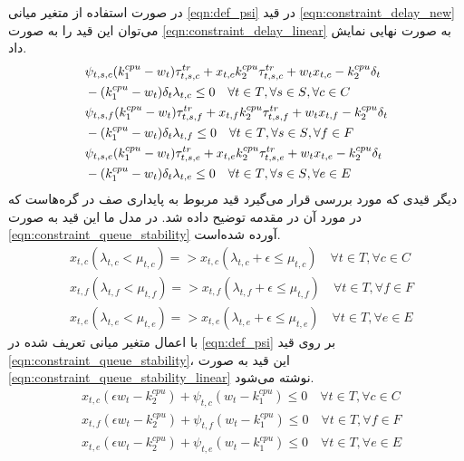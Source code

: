 	در صورت استفاده از متغیر میانی \cref{eqn:def_psi} در قید \cref{eqn:constraint_delay_new} می‌توان این قید را به صورت \cref{eqn:constraint_delay_linear} به صورت نهایی نمایش داد. 
	\begin{subequations}\label{eqn:constraint_delay_linear}
		\begin{align}
		&\notag\psi_{t,s,c}(k_1^{cpu}-w_t)\tau^{tr}_{t,s,c} + x_{t,c}k_2^{cpu}\tau_{t,s,c}^{tr}+w_t x_{t,c}-k_2^{cpu}\delta_t \\ &-(k_1^{cpu}-w_t)\delta_t\lambda_{t,c} \le 0 \quad \forall{t \in T}, \forall{s \in S}, \forall{c \in C} \\
		&\notag\psi_{t,s,f}(k_1^{cpu}-w_t)\tau^{tr}_{t,s,f} + x_{t,f}k_2^{cpu}\tau_{t,s,f}^{tr}+w_t x_{t,f}-k_2^{cpu}\delta_t \\ &-(k_1^{cpu}-w_t)\delta_t\lambda_{t,f} \le 0 \quad \forall{t \in T}, \forall{s \in S}, \forall{f \in F} \\
		&\notag\psi_{t,s,e}(k_1^{cpu}-w_t)\tau^{tr}_{t,s,e} + x_{t,e}k_2^{cpu}\tau_{t,s,e}^{tr}+w_t x_{t,e}-k_2^{cpu}\delta_t \\ &-(k_1^{cpu}-w_t)\delta_t\lambda_{t,e} \le 0 \quad \forall{t \in T}, \forall{s \in S}, \forall{e \in E}
		\end{align}
	\end{subequations}
	دیگر قیدی که مورد بررسی قرار می‌گیرد قید مربوط به پایداری صف در گره‌هاست که در مورد آن در مقدمه توضیح داده شد. در مدل ما این قید به صورت \cref{eqn:constraint_queue_stability} آورده شده‌است.
	\begin{subequations}\label{eqn:constraint_queue_stability}
		\begin{align}
		&x_{t,c}(\lambda_{t,c} < \mu_{t,c}) => x_{t,c}(\lambda_{t,c} + \epsilon \le \mu_{t,c}) \quad \forall{t \in T}, \forall{c \in C}\\
		&x_{t,f}(\lambda_{t,f} < \mu_{t,f}) => x_{t,f}(\lambda_{t,f} + \epsilon \le \mu_{t,f}) \quad \forall{t \in T}, \forall{f \in F} \\
		&x_{t,e}(\lambda_{t,e} < \mu_{t,e}) => x_{t,e}(\lambda_{t,e} + \epsilon \le \mu_{t,e}) \quad \forall{t \in T}, \forall{e \in E}
		\end{align}
	\end{subequations}
	با اعمال متغیر میانی تعریف شده در \cref{eqn:def_psi} بر روی قید \cref{eqn:constraint_queue_stability}، این قید به صورت \cref{eqn:constraint_queue_stability_linear} نوشته می‌شود. 
	\begin{subequations}\label{eqn:constraint_queue_stability_linear}
		\begin{align}
			&x_{t,c}(\epsilon w_t - k_2^{cpu}) + \psi_{t,c}(w_t - k_1^{cpu}) \le 0 \quad \forall{t \in T}, \forall{c \in C} \\
			&x_{t,f}(\epsilon w_t - k_2^{cpu}) + \psi_{t,f}(w_t - k_1^{cpu}) \le 0 \quad \forall{t \in T}, \forall{f \in F} \\
			&x_{t,e}(\epsilon w_t - k_2^{cpu}) + \psi_{t,e}(w_t - k_1^{cpu}) \le 0 \quad \forall{t \in T}, \forall{e \in E}
		\end{align}
	\end{subequations}
